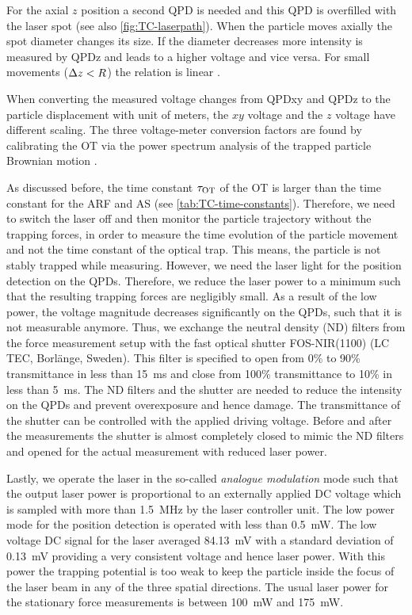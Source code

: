 For the axial $z$ position a second QPD is needed and this QPD is overfilled 
with the laser spot (see also \cref{fig:TC-laserpath}). When the particle moves 
axially the spot diameter changes its size. If the diameter decreases more 
intensity is measured by QPDz and leads to a higher voltage and vice versa. For 
small movements ($\Delta z < R$) the relation is linear \cite{Dreyer2004}.

When converting the measured voltage changes from QPDxy and QPDz to the 
particle displacement with unit of meters, the $xy$ voltage and the $z$ voltage 
have different scaling. The three voltage-meter conversion factors are found by 
calibrating the OT via the power spectrum analysis of the trapped particle 
Brownian motion \cite{Lamprecht2021,Lamprecht2016,Lakaemper2015}.

As discussed before, the time constant $\tau_{\mathrm{OT}}$ of the OT is larger than the 
time constant for the ARF and AS (see \cref{tab:TC-time-constants}). Therefore, we 
need to switch the laser off and then monitor the particle trajectory without 
the trapping forces, in order to measure the time evolution of the particle 
movement and not the time constant of the optical trap. This means, the particle 
is not stably trapped while measuring. However, we need the laser light for 
the position detection on the QPDs. Therefore, we reduce the laser power to a 
minimum such that the resulting trapping forces are negligibly small. As a 
result of the low power, the voltage magnitude decreases significantly on the 
QPDs, such that it is not measurable anymore. Thus, we exchange the neutral 
density (ND) filters from the force measurement setup 
\cite{Lamprecht2016,Lamprecht2021} with the fast optical shutter FOS-NIR(1100) 
(LC TEC, Borlänge, Sweden). This filter is specified to open from 0\% to 90\% 
transmittance in less than \SI{15}{\ms} and close from 100\% transmittance to 
10\% in less than \SI{5}{\ms}. The ND filters and the shutter are needed to 
reduce the intensity on the QPDs and prevent overexposure and hence damage. 
The transmittance of the shutter can be controlled with the applied driving 
voltage. Before and after the measurements the shutter is almost completely 
closed to mimic the ND filters and opened for the actual measurement with 
reduced laser power.

Lastly, we operate the laser in the so-called \emph{analogue modulation} mode 
such that the output laser power is proportional to an externally applied DC 
voltage which is sampled with more than \SI{1.5}{\MHz} by the laser controller 
unit. The low power mode for the position detection is operated with less than 
\SI{0.5}{\mW}. The low voltage DC signal for the laser averaged \SI{84.13}{\mV} 
with a standard deviation of \SI{0.13}{\mV} providing a very consistent voltage 
and hence laser power. With this power the trapping potential is too weak to 
keep the particle inside the focus of the laser beam in any of the three 
spatial directions. The usual laser power for the stationary force measurements 
is between \SI{100}{\mW} and \SI{175}{\mW}.


